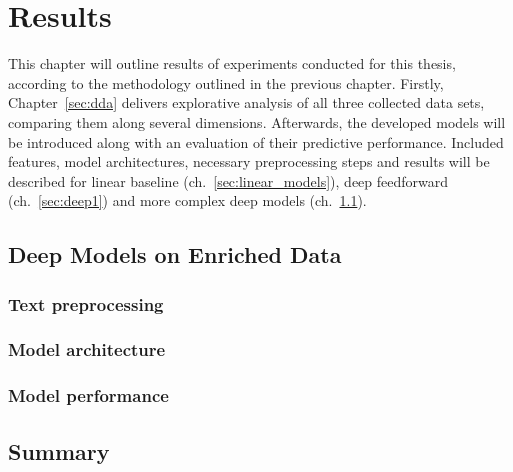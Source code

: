 \section{Results}
\label{ch:results}

This chapter will outline results of experiments conducted for this thesis,
according to the methodology outlined in the previous chapter.
Firstly, Chapter~\ref{sec:dda} delivers explorative analysis of all three
collected data sets, comparing them along several dimensions.
Afterwards, the developed models will be introduced along with an evaluation
of their predictive performance.
Included features, model architectures, necessary preprocessing steps and results will
be described for linear baseline (ch.~\ref{sec:linear_models}),
deep feedforward (ch.~\ref{sec:deep1}) and more complex deep models
(ch.~\ref{sec:deep_combined}).







\subsection{Deep Models on Enriched Data}
\label{sec:deep_combined}

\subsubsection{Text preprocessing}
\label{sub:text_preprocess}

\subsubsection{Model architecture}
\label{sub:model_architecture}

\subsubsection{Model performance}
\label{sub:comb_performance}

\subsection{Summary}
\label{sec:res_summary}
